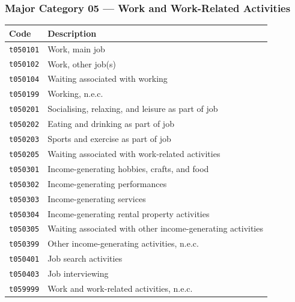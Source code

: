 \documentclass[11pt, a4paper]{article}
\begin{document}
\subsubsection*{Major Category 05 --- Work and Work-Related Activities}
\begin{longtable}{L{3cm} L{13cm}}
\toprule \textbf{Code} & \textbf{Description} \\ \midrule \endhead
\bottomrule \endfoot
\texttt{t050101} & Work, main job \\
 \texttt{t050102} & Work, other job(s) \\
\texttt{t050104} & Waiting associated with working \\
 \texttt{t050199} & Working, n.e.c. \\
\texttt{t050201} & Socialising, relaxing, and leisure as part of job \\
 \texttt{t050202} & Eating and drinking as part of job \\
\texttt{t050203} & Sports and exercise as part of job \\
 \texttt{t050205} & Waiting associated with work-related activities \\
\texttt{t050301} & Income-generating hobbies, crafts, and food \\
 \texttt{t050302} & Income-generating performances \\
\texttt{t050303} & Income-generating services \\
 \texttt{t050304} & Income-generating rental property activities \\
\texttt{t050305} & Waiting associated with other income-generating activities \\
 \texttt{t050399} & Other income-generating activities, n.e.c. \\
\texttt{t050401} & Job search activities \\
 \texttt{t050403} & Job interviewing \\
\texttt{t059999} & Work and work-related activities, n.e.c. \\
\end{longtable}
\end{document}
